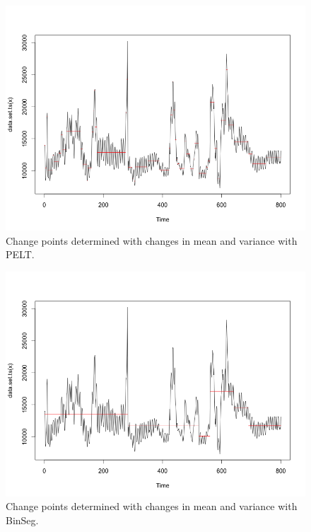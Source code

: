 \documentclass[minf,twoside,singlespacing,parskip,notimes,deptreport]{infthesis} %
\begin{document}
\begin{figure}[h!]
\begin{center}
\includegraphics[width=\textwidth]{meanvar_pelt}
\end{center}
\caption{Change points determined with changes in mean and variance with PELT.}
\label{pelt-meanvar}
\end{figure}
\begin{figure}[h!]
\begin{center}
\includegraphics[width=\textwidth]{meanvar_binset}
\end{center}
\caption{Change points determined with changes in mean and variance with BinSeg.}
\label{meanvar-binseg}
\end{figure}
\end{document}
